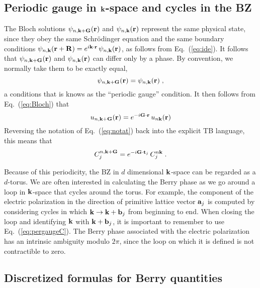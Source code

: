 \documentclass[11pt]{article}
\numberwithin{equation}{section} %
\def\beq{\begin{equation}}
\def\eeq{\end{equation}}
\newcommand{\equ}[1]{Eq.~(\ref{eq:#1})}
\def\k{{\bf k}}
\def\r{{\bf r}}
\def\R{{\bf R}}
\def\G{{\bf G}}
\def\t{{\bf t}}
\def\a{{\bf a}}
\def\b{{\bf b}}
\def\t{{\bf t}}
\begin{document}
\subsection{Periodic gauge in $\k$-space and cycles in the BZ}
\label{sec:periodic}

The Bloch solutions $\psi_{n,\k+\G}(\r)$ and $\psi_{n,\k}(\r)$
represent the same physical state, since they obey the same
Schr\"odinger equation and the same boundary conditions
$\psi_{n,\k}(\r+\R)=e^{i\k\cdot\r}\,\psi_{n,\k}(\r)$,
as follows from \equ{ide}.  It follows that $\psi_{n,\k+\G}(\r)$
and $\psi_{n,\k}(\r)$ can differ only by a phase.  By convention,
we normally take them to be exactly equal,
%
\beq
\psi_{n,\k+\G}(\r)=\psi_{n,\k}(\r) \;,
\label{eq:pergauge}
\eeq
%
a conditions that is
knows as the ``periodic gauge'' condition.  It then follows from
\equ{Bloch} that
%
\beq
u_{n,\k+\G}(\r)=e^{-i\G\cdot\r}\,u_{n\k}(\r)
\label{eq:pergaugeu}
\eeq
%
Reversing the notation of \equ{notat} back into the explicit TB
language, this means that
%
\beq
C^{n,\k+\G}_j=e^{-i\G\cdot\t_j}\,C^{n\k}_j \;.
\label{eq:pergaugeC}
\eeq

Because of this periodicity, the BZ in $d$ dimensional $\k$-space
can be regarded as a $d$-torus.
We are often interested in calculating the Berry phase
as we go around a loop in $\k$-space that cycles around the
torus.  For example, the component of the electric polarization
in the direction of primitive lattice vector $\a_j$ is computed
by considering cycles in which $\k \rightarrow \k+\b_j$ from
beginning to end.  When closing the loop and identifying
$\k$ with $\k+\b_j$, it is important to remember to use
\equ{pergaugeC}.  The Berry phase associated with the electric
polarization has an intrinsic ambiguity modulo $2\pi$, since
the loop on which it is defined is not contractible to zero.

\subsection{Discretized formulas for Berry quantities}
\end{document}
